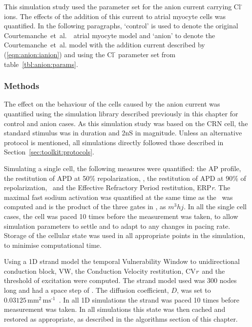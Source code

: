 This simulation study used the parameter set for the anion current carrying
$\text{Cl}^{\text{-}}$ ions.
The effects of the addition of this current to atrial myocyte cells was
quantified.
In the following paragraphs, `control' is used to denote the original
Courtemanche~et~al.~\cite{CRN98}\ atrial myocyte model and `anion' to denote the
Courtemanche~et~al. model with the addition current described by
(\ref{eqn:anion:ianion}) and using the $\text{Cl}^{\text{-}}$ parameter set from
table~\ref{tbl:anion:params}.

\subsubsection{Methods}

The effect on the behaviour of the cells caused by the anion current was
quantified using the simulation library described previously in this chapter for
control and anion cases.
As this simulation study was based on the CRN cell, the standard stimulus was
 in duration and \unit{2}{nS} in magnitude.
Unless an alternative protocol is mentioned, all simulations directly followed
those described in Section~\ref{sec:toolkit:protocols}.

Simulating a single cell, the following measures were quantified: the AP
profile, the restitution of APD at 50\% repolarization, \apdr[50], the
restitution of APD at 90\% of repolarization, \apdr\ and the Effective
Refractory Period restitution, ERP\emph{r}.  The maximal fast sodium activation
was quantified at the same time as the \apdr\ was computed and is the product of
the three gates in , as $m^{3}hj$. In all the single cell cases, the
cell was paced 10 times before the measurement was taken, to allow simulation
parameters to settle and to adapt to any changes in pacing rate.  Storage of the
cellular state was used in all appropriate points in the simulation, to minimise
computational time.

Using a 1D strand model the temporal Vulnerability Window to unidirectional
conduction block, VW, the Conduction Velocity restitution, CV\emph{r}\ and the
threshold of excitation were computed.  The strand model used was 300 nodes long
and had a space step of .  The diffusion coefficient, $D$, was set to
$0.03125\,\text{mm}^{\text{2}}\,\text{ms}^{\text{-1}}$~\cite{Biktasheva2005}.
In all 1D simulations the strand was paced 10 times before measurement was
taken.  In all simulations this state was then cached and restored as
appropriate, as described in the algorithms section of this chapter.


